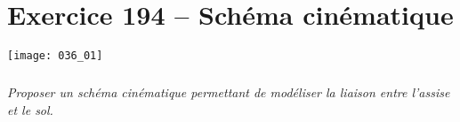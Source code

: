 \section*{Exercice 194 -- Schéma cinématique}
\setcounter{exo}{0}


\begin{center}
\texttt{[image: 036\_01]}
\end{center}

\subparagraph{}
\textit{Proposer un schéma cinématique permettant de modéliser la liaison entre l'assise et le sol.}
\ifprof
\begin{corrige}

\end{corrige}
\else
\fi
